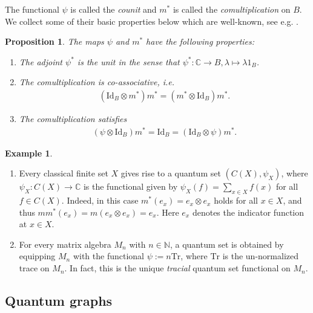 \documentclass{amsart}
\newcommand{\C}{\mathbb{C}}
\newcommand{\N}{\mathbb{N}}
\newtheorem{proposition}[thm]{Proposition}
\theoremstyle{definition}
\newtheorem{example}[thm]{Example}
\theoremstyle{definition}
\begin{document}
The functional $\psi$ is called the \emph{counit} and $m^\ast$ is called the \emph{comultiplication} on $B$. We collect some of their basic properties below which are well-known, see e.g. \cite{musto_compositional_2018}.

\begin{proposition}
    \label{pre::prop:properties_of_counit_and_comultiplication}
    The maps $\psi$ and $m^\ast$ have the following properties:
    \begin{enumerate}
        \item The adjoint $\psi^\ast$ is the unit in the sense that $\psi^\ast: \C \to B, \lambda \mapsto \lambda 1_B$.
        \item The comultiplication is co-associative, i.e.
        \begin{align*}
            (\mathrm{Id}_B \otimes m^\ast)m^\ast = (m^\ast \otimes \mathrm{Id}_B)m^\ast.
        \end{align*}
        \item The comultiplication satisfies
        \begin{align*}
            (\psi \otimes \mathrm{Id}_B)m^\ast = \mathrm{Id}_B = (\mathrm{Id}_B \otimes \psi)m^\ast.
        \end{align*}
    \end{enumerate}
\end{proposition}

\begin{example}
    \label{pre::ex:examples_of_quantum_sets}
    \begin{enumerate}
        \item 
            Every classical finite set $X$ gives rise to a quantum set $(C(X), \psi_X)$, where $\psi_X: C(X) \to \C$ is the functional given by $\psi_X(f) = \sum_{x \in X} f(x)$ for all $f \in C(X)$. Indeed, in this case $m^\ast(e_x) = e_x \otimes e_x$ holds for all $x \in X$, and thus $m m^\ast(e_x) = m(e_x \otimes e_x) = e_x$. Here $e_x$ denotes the indicator function at $x \in X$.
        \item For every matrix algebra $M_n$ with $n \in \N$, a quantum set is obtained by equipping $M_n$ with the functional $\psi := n \mathrm{Tr}$, where $\mathrm{Tr}$ is the un-normalized trace on $M_n$. In fact, this is the unique \emph{tracial} quantum set functional on $M_n$.
    \end{enumerate}
\end{example}

\subsection{Quantum graphs}
\end{document}
